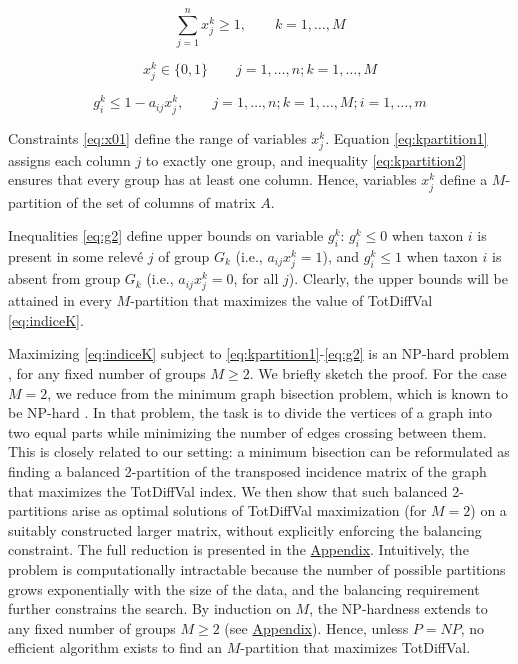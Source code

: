 \begin{equation}
\sum_{j=1}^n x_j^k\geq 1, \quad \quad k=1,\dots,M
\label{eq:kpartition2}
\end{equation}

\begin{equation}
x_j^k\in \{0,1\} \quad \quad j=1,\dots,n; k=1,\dots,M
\label{eq:x01}
\end{equation}

\begin{equation}
g_i^k\leq 1 - a_{ij}x_j^k, \quad \quad j=1,\dots,n; k=1,\dots,M; i=1,\dots,m
\label{eq:g2}
\end{equation}

Constraints \eqref{eq:x01} define the range of variables \(x_j^k\). Equation \eqref{eq:kpartition1} assigns each column \(j\) to exactly one group, and inequality \eqref{eq:kpartition2} ensures that every group has at least one column. Hence, variables \(x_j^k\) define a \(M\)-partition of the set of columns of matrix \(A\).

Inequalities \eqref{eq:g2} define upper bounds on variable \(g_i^k\): \(g_i^k\leq 0\) when taxon \(i\) is present in some relevé \(j\) of group \(G_k\) (i.e., \(a_{ij}x_j^k=1\)), and \(g_i^k\leq 1\) when taxon \(i\) is absent from group \(G_k\) (i.e., \(a_{ij}x_j^k=0\), for all \(j\)). Clearly, the upper bounds will be attained in every \(M\)-partition that maximizes the value of TotDiffVal \eqref{eq:indiceK}.

Maximizing \eqref{eq:indiceK} subject to \eqref{eq:kpartition1}-\eqref{eq:g2} is an NP-hard problem \citep{GJ1979}, for any fixed number of groups \(M\geq 2\). We briefly sketch the proof. For the case \(M=2\), we reduce from the minimum graph bisection problem, which is known to be NP-hard \citep{GJS1976}. In that problem, the task is to divide the vertices of a graph into two equal parts while minimizing the number of edges crossing between them. This is closely related to our setting: a minimum bisection can be reformulated as finding a balanced 2-partition of the transposed incidence matrix of the graph that maximizes the TotDiffVal index. We then show that such balanced 2-partitions arise as optimal solutions of TotDiffVal maximization (for \(M=2\)) on a suitably constructed larger matrix, without explicitly enforcing the balancing constraint. The full reduction is presented in the \hyperref[appendix]{Appendix}. Intuitively, the problem is computationally intractable because the number of possible partitions grows exponentially with the size of the data, and the balancing requirement further constrains the search. By induction on \(M\), the NP-hardness extends to any fixed number of groups \(M\geq 2\) (see \hyperref[appendix]{Appendix}). Hence, unless \(P=NP\), no efficient algorithm exists to find an \(M\)-partition that maximizes TotDiffVal.

